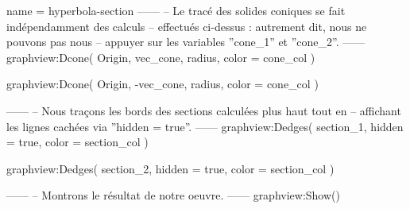 \documentclass{standalone}
\begin{document}
\begin{luadraw*}{name = hyperbola-section}
------
-- Le tracé des solides coniques se fait indépendamment des calculs
-- effectués ci-dessus : autrement dit, nous ne pouvons pas nous
-- appuyer sur les variables ''cone_1'' et ''cone_2''.
------
graphview:Dcone(
  Origin, vec_cone, radius,
  {
    color = cone_col
  }
)

graphview:Dcone(
  Origin, -vec_cone, radius,
  {
    color = cone_col
  }
)

------
-- Nous traçons les bords des sections calculées plus haut tout en
-- affichant les lignes cachées via ''hidden = true''.
------
graphview:Dedges(
  section_1,
  {
    hidden = true,
    color = section_col
  }
)

graphview:Dedges(
  section_2,
  {
    hidden = true,
    color = section_col
  }
)

------
-- Montrons le résultat de notre oeuvre.
------
graphview:Show()
\end{luadraw*}
\end{document}
